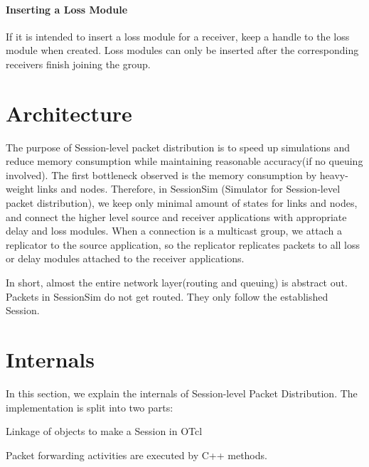 \paragraph{Inserting a Loss Module}

If it is intended to insert a loss module for a receiver, keep a handle to the 
loss module when created.  Loss modules can only be inserted after the
corresponding receivers finish joining the group.


\section{Architecture}
\label{sec:session-arch}
The purpose of Session-level packet distribution is to
speed up simulations and reduce memory consumption while 
maintaining reasonable accuracy(if no queuing involved).  The first
bottleneck observed is the memory consumption by heavy-weight
links and nodes.  Therefore, in SessionSim (Simulator for Session-level
packet distribution), we keep only minimal amount of 
states for links and nodes, and connect the higher level source and 
receiver applications with appropriate delay and loss modules.  When
a connection is a multicast group, we attach a replicator 
to the source application, so the replicator replicates packets
to all loss or delay modules attached to the receiver applications.

In short, almost the entire network layer(routing and queuing)
is abstract out.  Packets in SessionSim do not get routed.  
They only follow the established Session.

\section{Internals}
In this section, we explain the internals of Session-level Packet 
Distribution.  The implementation is split into two parts:
\begin{list}{}{}
\item  Linkage of objects to make a Session in OTcl 
\item  Packet forwarding activities are executed by C++ methods.  
\end{list}

